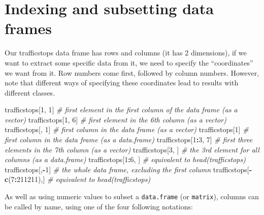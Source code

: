 \documentclass[]{book}
\newenvironment{Shaded}{\begin{snugshade}}{\end{snugshade}}
\newcommand{\KeywordTok}[1]{\textcolor[rgb]{0.13,0.29,0.53}{\textbf{#1}}}
\newcommand{\DecValTok}[1]{\textcolor[rgb]{0.00,0.00,0.81}{#1}}
\newcommand{\StringTok}[1]{\textcolor[rgb]{0.31,0.60,0.02}{#1}}
\newcommand{\CommentTok}[1]{\textcolor[rgb]{0.56,0.35,0.01}{\textit{#1}}}
\newcommand{\OperatorTok}[1]{\textcolor[rgb]{0.81,0.36,0.00}{\textbf{#1}}}
\newcommand{\NormalTok}[1]{#1}
\theoremstyle{definition}
\theoremstyle{definition}
\theoremstyle{definition}
\theoremstyle{remark}
\begin{document}
\section{Indexing and subsetting data
frames}\label{indexing-and-subsetting-data-frames}

Our trafficstops data frame has rows and columns (it has 2 dimensions),
if we want to extract some specific data from it, we need to specify the
``coordinates'' we want from it. Row numbers come first, followed by
column numbers. However, note that different ways of specifying these
coordinates lead to results with different classes.

\begin{Shaded}
\begin{Highlighting}[]
\NormalTok{trafficstops[}\DecValTok{1}\NormalTok{, }\DecValTok{1}\NormalTok{]   }\CommentTok{# first element in the first column of the data frame (as a vector)}
\NormalTok{trafficstops[}\DecValTok{1}\NormalTok{, }\DecValTok{6}\NormalTok{]   }\CommentTok{# first element in the 6th column (as a vector)}
\NormalTok{trafficstops[, }\DecValTok{1}\NormalTok{]    }\CommentTok{# first column in the data frame (as a vector)}
\NormalTok{trafficstops[}\DecValTok{1}\NormalTok{]      }\CommentTok{# first column in the data frame (as a data.frame)}
\NormalTok{trafficstops[}\DecValTok{1}\OperatorTok{:}\DecValTok{3}\NormalTok{, }\DecValTok{7}\NormalTok{] }\CommentTok{# first three elements in the 7th column (as a vector)}
\NormalTok{trafficstops[}\DecValTok{3}\NormalTok{, ]    }\CommentTok{# the 3rd element for all columns (as a data.frame)}
\NormalTok{trafficstops[}\DecValTok{1}\OperatorTok{:}\DecValTok{6}\NormalTok{, ]  }\CommentTok{# equivalent to head(trafficstops)}
\NormalTok{trafficstops[,}\OperatorTok{-}\DecValTok{1}\NormalTok{]           }\CommentTok{# the whole data frame, excluding the first column}
\NormalTok{trafficstops[}\OperatorTok{-}\KeywordTok{c}\NormalTok{(}\DecValTok{7}\OperatorTok{:}\DecValTok{211211}\NormalTok{),] }\CommentTok{# equivalent to head(trafficstops)}
\end{Highlighting}
\end{Shaded}

As well as using numeric values to subset a \texttt{data.frame} (or
\texttt{matrix}), columns can be called by name, using one of the four
following notations:

\begin{Shaded}
\end{Shaded}
\end{document}
